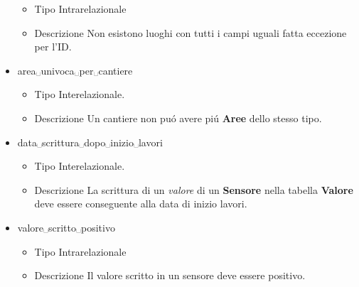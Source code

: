 \documentclass[11pt]{article}
\begin{document}
\begin{itemize}
\begin{itemize}
\item Tipo
\label{sec:org0a56a72}
Intrarelazionale
\item Descrizione
\label{sec:org70b77a2}
Non esistono luoghi con tutti i campi uguali fatta eccezione per l'ID.
\end{itemize}
\item area␣univoca␣per␣cantiere
\label{sec:orgc1dc759}
\begin{itemize}
\item Tipo
\label{sec:org701b205}
Interelazionale.
\item Descrizione
\label{sec:org537fb27}
Un cantiere non puó avere piú \textbf{Aree} dello stesso tipo.
\end{itemize}
\item data␣scrittura␣dopo␣inizio␣lavori
\label{sec:org70b22fa}
\begin{itemize}
\item Tipo
\label{sec:orga41b35c}
Interelazionale.
\item Descrizione
\label{sec:org17930ec}
La scrittura di un \emph{valore} di un \textbf{Sensore} nella tabella \textbf{Valore} deve essere conseguente alla data di inizio lavori.
\end{itemize}
\item valore␣scritto␣positivo
\label{sec:orge40d151}
\begin{itemize}
\item Tipo
\label{sec:org710b82d}
Intrarelazionale
\item Descrizione
\label{sec:org060f21e}
Il valore scritto in un sensore deve essere positivo.
\end{itemize}
\end{itemize}
\end{document}
